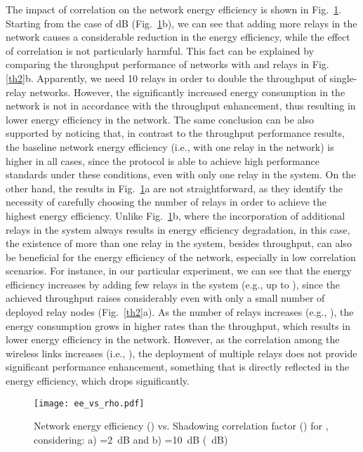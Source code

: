 \documentclass[12pt,draftcls, onecolumn]{IEEEtran}
\begin{document}
The impact of correlation on the network energy efficiency is shown in Fig.~\ref{ee2}. Starting from the case of  dB (Fig.~\ref{ee2}b), we can see that adding more relays in the network causes a considerable reduction in the energy efficiency, while the effect of correlation is not particularly harmful. This fact can be explained by comparing the throughput performance of networks with  and  relays in Fig. \ref{th2}b. Apparently, we need 10 relays in order to double the throughput of single-relay networks. However, the significantly increased energy consumption in the network is not in accordance with the throughput enhancement, thus resulting in lower energy efficiency in the network. The same conclusion can be also supported by noticing that, in contrast to the throughput performance results, the baseline network energy efficiency (i.e., with one relay in the network) is higher in all cases, since the protocol is able to achieve high performance standards under these conditions, even with only one relay in the system. On the other hand, the results in Fig.~\ref{ee2}a are not straightforward, as they identify the necessity of carefully choosing the number of relays in order to achieve the highest energy efficiency. Unlike Fig.~\ref{ee2}b, where the incorporation of additional relays in the system always results in energy efficiency degradation, in this case, the existence of more than one relay in the system, besides throughput, can also be beneficial for the energy efficiency of the network, especially in low correlation scenarios. For instance, in our particular experiment, we can see that the energy efficiency increases by adding few relays in the system (e.g., up to ), since the achieved throughput raises considerably even with only a small number of deployed relay nodes (Fig.~\ref{th2}a). As the number of relays increases (e.g., ), the energy consumption grows in higher rates than the throughput, which results in lower energy efficiency in the network. However, as the correlation among the wireless links increases (i.e., ), the deployment of multiple relays does not provide significant performance enhancement, something that is directly reflected in the energy efficiency, which drops significantly.

\begin{figure}[htb]
\centering
\texttt{[image: ee\_vs\_rho.pdf]}
\caption{Network energy efficiency () vs. Shadowing correlation factor () for , considering: a) =2~dB and b) =10~dB (~dB)}\label{ee2}
\end{figure}
\end{document}
